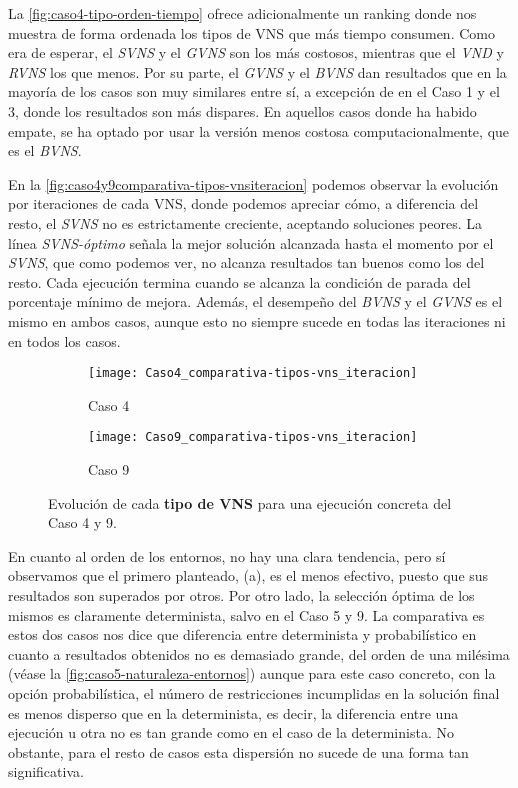 La \autoref{fig:caso4-tipo-orden-tiempo} ofrece adicionalmente un ranking donde nos muestra de forma ordenada los tipos de VNS que más tiempo consumen. Como era de esperar, el \textit{SVNS} y el \textit{GVNS} son los más costosos, mientras que el \textit{VND} y \textit{RVNS} los que menos. Por su parte, el \textit{GVNS} y el \textit{BVNS} dan resultados que en la mayoría de los casos son muy similares entre sí, a excepción de en el Caso 1 y el 3, donde los resultados son más dispares. En aquellos casos donde ha habido empate, se ha optado por usar la versión menos costosa computacionalmente, que es el \textit{BVNS}.

En la \autoref{fig:caso4y9comparativa-tipos-vnsiteracion} podemos observar la evolución por iteraciones de cada VNS, donde podemos apreciar cómo, a diferencia del resto, el \textit{SVNS} no es estrictamente creciente, aceptando soluciones peores. La línea \textit{SVNS-óptimo} señala la mejor solución alcanzada hasta el momento por el \textit{SVNS}, que como podemos ver, no alcanza resultados tan buenos como los del resto. Cada ejecución termina cuando se alcanza la condición de parada del porcentaje mínimo de mejora. Además, el desempeño del \textit{BVNS} y el \textit{GVNS} es el mismo en ambos casos, aunque esto no siempre sucede en todas las iteraciones ni en todos los casos.

\begin{figure}
	\begin{subfigure}{\linewidth}
		\centering
		\texttt{[image: Caso4\_comparativa-tipos-vns\_iteracion]}
		\caption{Caso 4}
		\label{fig:caso4comparativa-tipos-vnsiteracion}
	\end{subfigure}

	\begin{subfigure}{\linewidth}
		\centering
		\texttt{[image: Caso9\_comparativa-tipos-vns\_iteracion]}
		\caption{Caso 9}
		\label{fig:caso9comparativa-tipos-vnsiteracion}
	\end{subfigure}
	\caption{Evolución de cada \textbf{tipo de VNS} para una ejecución concreta del Caso 4 y 9.}
	\label{fig:caso4y9comparativa-tipos-vnsiteracion}
\end{figure}

En cuanto al orden de los entornos, no hay una clara tendencia, pero sí observamos que el primero planteado, (a), es el menos efectivo, puesto que sus resultados son superados por otros. Por otro lado, la selección óptima de los mismos es claramente determinista, salvo en el Caso 5 y 9. 
La comparativa es estos dos casos nos dice que diferencia entre determinista y probabilístico en cuanto a resultados obtenidos no es demasiado grande, del orden de una milésima (véase la \autoref{fig:caso5-naturaleza-entornos}) aunque para este caso concreto, con la opción probabilística, el número de restricciones incumplidas en la solución final es menos disperso que en la determinista, es decir, la diferencia entre una ejecución u otra no es tan grande como en el caso de la determinista. No obstante, para el resto de casos esta dispersión no sucede de una forma tan significativa.

